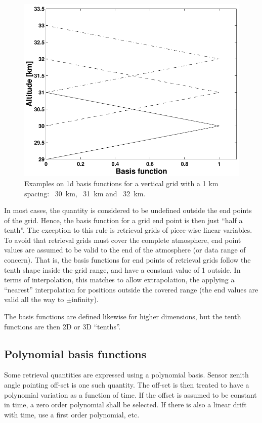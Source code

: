 \begin{figure}[t]
 \begin{center}
  \includegraphics*[width=0.7\hsize]{fig_absbasis_z}
  \caption{Examples on 1d basis functions for a vertical grid with a 1 km
           spacing: \lsolid~30~km, \ldashed~31~km and \ldashdot~32~km.}
  \label{fig:wfuns:zbasis}  
 \end{center}
\end{figure}

In most cases, the quantity is considered to be undefined outside the end
points of the grid. Hence, the basis function for a grid end point is then just
``half a tenth''. The exception to this rule is retrieval grids of piece-wise
linear variables. To avoid that retrieval grids must cover the complete
atmosphere, end point values are assumed to be valid to the end of the
atmosphere (or data range of concern). That is, the basis functions for end
points of retrieval grids follow the tenth shape inside the grid range, and
have a constant value of 1 outside. In terms of interpolation, this matches to
allow extrapolation, the applying a ``nearest'' interpolation for positions
outside the covered range (the end values are valid all the way to
$\pm$infinity).

The basis functions are defined likewise for higher dimensions, but the
tenth functions are then 2D or 3D ``tenths''.




\subsection{Polynomial basis functions}
\label{sec:wfuns:basis2}
%
Some retrieval quantities are expressed using a polynomial basis. Sensor zenith
angle pointing off-set is one such quantity. The off-set is then treated to
have a polynomial variation as a function of time. If the offset is assumed to
be constant in time, a zero order polynomial shall be selected. If there is
also a linear drift with time, use a first order polynomial, etc.

